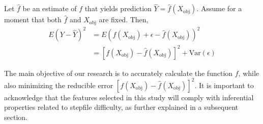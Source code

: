\vspace{2mm}

Let $\hat{f}$ be an estimate of $f$ that yields prediction $\hat{Y} = \hat{f}(X_{\text{obj}})$. Assume for a moment that both $\hat{f}$ and $X_{\text{obj}}$ are fixed. Then,
\begin{align*}
    E(Y - \hat{Y})^2 & = E(f(X_{\text{obj}}) + \epsilon - \hat{f}(X_{\text{obj}}))^2 \\
    & = [f(X_{\text{obj}}) - \hat{f}(X_{\text{obj}})]^2 + \text{Var}(\epsilon)
\end{align*}

The main objective of our research is to accurately calculate the function $f$, while also minimizing the reducible error $[f(X_{\text{obj}}) - \hat{f}(X_{\text{obj}})]^2$. It is important to acknowledge that the features selected in this study will comply with inferential properties related to stepfile difficulty, as further explained in a subsequent section.

\vspace{2mm}






